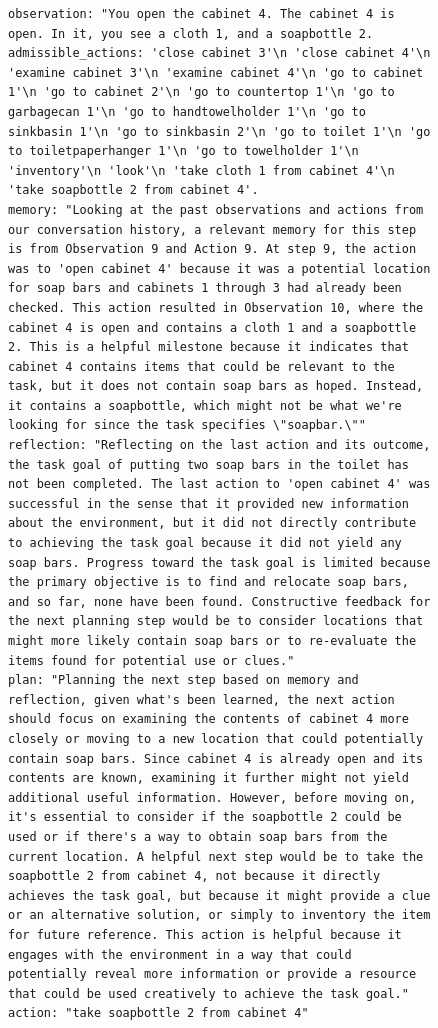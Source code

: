 \documentclass[../../main.tex]{subfiles}
\begin{document}
\begin{figure}[htbp]
\begin{tcolorbox}[
    title=\textbf{Error Type - Impossible Action},
    colback=orange!1!white,
    colframe=orange!50!black,
    fonttitle=\bfseries,
    enhanced jigsaw,
    breakable
]
\begin{Verbatim}[breaklines=true, breakanywhere=true]
observation: "You open the cabinet 4. The cabinet 4 is open. In it, you see a cloth 1, and a soapbottle 2.
admissible_actions: 'close cabinet 3'\n 'close cabinet 4'\n 'examine cabinet 3'\n 'examine cabinet 4'\n 'go to cabinet 1'\n 'go to cabinet 2'\n 'go to countertop 1'\n 'go to garbagecan 1'\n 'go to handtowelholder 1'\n 'go to sinkbasin 1'\n 'go to sinkbasin 2'\n 'go to toilet 1'\n 'go to toiletpaperhanger 1'\n 'go to towelholder 1'\n 'inventory'\n 'look'\n 'take cloth 1 from cabinet 4'\n 'take soapbottle 2 from cabinet 4'.
memory: "Looking at the past observations and actions from our conversation history, a relevant memory for this step is from Observation 9 and Action 9. At step 9, the action was to 'open cabinet 4' because it was a potential location for soap bars and cabinets 1 through 3 had already been checked. This action resulted in Observation 10, where the cabinet 4 is open and contains a cloth 1 and a soapbottle 2. This is a helpful milestone because it indicates that cabinet 4 contains items that could be relevant to the task, but it does not contain soap bars as hoped. Instead, it contains a soapbottle, which might not be what we're looking for since the task specifies \"soapbar.\""
reflection: "Reflecting on the last action and its outcome, the task goal of putting two soap bars in the toilet has not been completed. The last action to 'open cabinet 4' was successful in the sense that it provided new information about the environment, but it did not directly contribute to achieving the task goal because it did not yield any soap bars. Progress toward the task goal is limited because the primary objective is to find and relocate soap bars, and so far, none have been found. Constructive feedback for the next planning step would be to consider locations that might more likely contain soap bars or to re-evaluate the items found for potential use or clues."
plan: "Planning the next step based on memory and reflection, given what's been learned, the next action should focus on examining the contents of cabinet 4 more closely or moving to a new location that could potentially contain soap bars. Since cabinet 4 is already open and its contents are known, examining it further might not yield additional useful information. However, before moving on, it's essential to consider if the soapbottle 2 could be used or if there's a way to obtain soap bars from the current location. A helpful next step would be to take the soapbottle 2 from cabinet 4, not because it directly achieves the task goal, but because it might provide a clue or an alternative solution, or simply to inventory the item for future reference. This action is helpful because it engages with the environment in a way that could potentially reveal more information or provide a resource that could be used creatively to achieve the task goal."
action: "take soapbottle 2 from cabinet 4"
\end{Verbatim}


\end{tcolorbox}
\end{figure}
\end{document}
